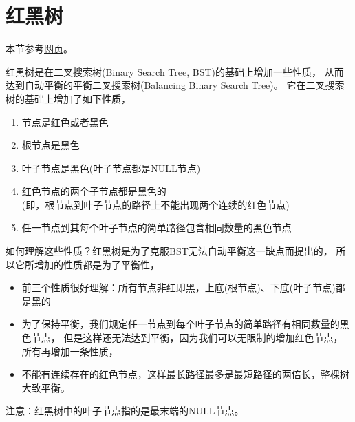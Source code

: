 \section[红黑树]{红黑树}
本节参考\href{http://zh.wikipedia.org/wiki/红黑树}{网页}。

红黑树是在二叉搜索树(Binary Search Tree, BST)的基础上增加一些性质，
从而达到自动平衡的平衡二叉搜索树(Balancing Binary Search Tree)。
它在二叉搜索树的基础上增加了如下性质，
\begin{enumerate}
  \item 节点是红色或者黑色
  \item 根节点是黑色
  \item 叶子节点是黑色(叶子节点都是NULL节点)
  \item 红色节点的两个子节点都是黑色的\\
  (即，根节点到叶子节点的路径上不能出现两个连续的红色节点)
  \item 任一节点到其每个叶子节点的简单路径包含相同数量的黑色节点
\end{enumerate}
如何理解这些性质？红黑树是为了克服BST无法自动平衡这一缺点而提出的，
所以它所增加的性质都是为了平衡性，
\begin{itemize}
  \item 前三个性质很好理解：所有节点非红即黑，上底(根节点)、下底(叶子节点)都是黑的
  \item 为了保持平衡，我们规定任一节点到每个叶子节点的简单路径有相同数量的黑色节点，
  但是这样还无法达到平衡，因为我们可以无限制的增加红色节点，所有再增加一条性质，
  \item 不能有连续存在的红色节点，这样最长路径最多是最短路径的两倍长，整棵树大致平衡。
\end{itemize}
注意：红黑树中的叶子节点指的是最末端的NULL节点。

